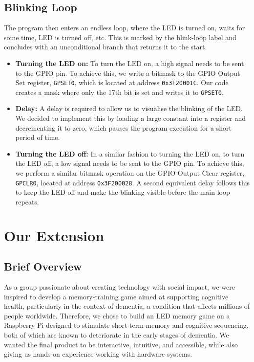 \documentclass[11pt]{article}
\begin{document}
\subsection{Blinking Loop}

The program then enters an endless loop, where the LED is turned on, waits for some time, LED is turned off, etc. This is marked by the blink-loop label and concludes with an unconditional branch that returns it to the start.

\begin{itemize}
    \item \textbf{Turning the LED on:} To turn the LED on, a high signal needs to be sent to the GPIO pin. To achieve this, we write a bitmask to the GPIO Output Set register, \texttt{GPSET0}, which is located at address \texttt{0x3F20001C}. Our code creates a mask where only the 17th bit is set and writes it to \texttt{GPSET0}.
    \item \textbf{Delay:} A delay is required to allow us to visualise the blinking of the LED. We decided to implement this by loading a large constant into a register and decrementing it to zero, which pauses the program execution for a short period of time.
    \item \textbf{Turning the LED off:} In a similar fashion to turning the LED on, to turn the LED off, a low signal needs to be sent to the GPIO pin. To achieve this, we perform a similar bitmask operation on the GPIO Output Clear register, \texttt{GPCLR0}, located at address \texttt{0x3F200028}. A second equivalent delay follows this to keep the LED off and make the blinking visible before the main loop repeats.
    
\end{itemize}

\section{Our Extension}

\subsection{Brief Overview}
As a group passionate about creating technology with social impact, we were inspired to develop a memory-training game aimed at supporting cognitive health, particularly in the context of dementia, a condition that affects millions of people worldwide. Therefore, we chose to build an LED memory game on a Raspberry Pi designed to stimulate short-term memory and cognitive sequencing, both of which are known to deteriorate in the early stages of dementia. We wanted the final product to be interactive, intuitive, and accessible, while also giving us hands-on experience working with hardware systems.
\end{document}
